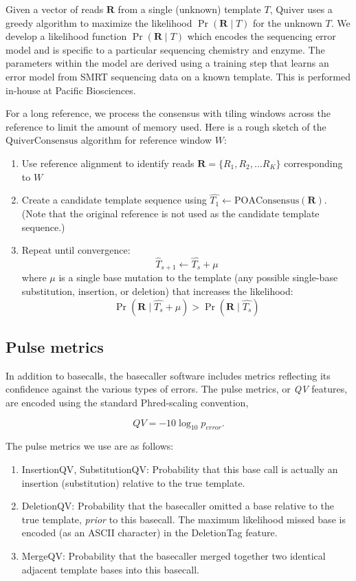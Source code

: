 \documentclass[11pt]{article}
\begin{document}
Given a vector of reads $\mathbf{R}$ from a single (unknown) template $T$, Quiver uses a greedy algorithm to maximize the likelihood $\Pr(\mathbf{R} \mid T)$ for the unknown $T$. We develop a likelihood function $\Pr(\mathbf{R} \mid T)$ which encodes the sequencing error model and is specific to a particular sequencing chemistry and enzyme.  The parameters within the model are derived using a training step that learns an error model from SMRT sequencing data on a known template. This is performed in-house at Pacific Biosciences.

For a long reference, we process the consensus with tiling windows across the reference to limit the amount of memory used. Here is a rough sketch of the $\mathrm{QuiverConsensus}$ algorithm for reference window $W$:\begin{enumerate}
   \item Use reference alignment to identify reads $\mathbf{R}=\{R_1, R_2, \ldots R_K\}$ corresponding to $W$
   \item Create a candidate template sequence using $\hat{T_1} \leftarrow \mathrm{POAConsensus}(\mathbf{R})$. (Note that the original reference is not used as the candidate template sequence.)
   \item Repeat until convergence: $$\hat{T}_{s+1} \leftarrow \hat{T_{s}} + \mu$$ where $\mu$ is a single base mutation to the template (any possible single-base substitution, insertion, or deletion) that increases the likelihood:
     $$\Pr(\mathbf{R} \mid \hat{T_s} + \mu) > \Pr(\mathbf{R} \mid \hat{T_s})$$

\end{enumerate}

\subsection{Pulse metrics}

In addition to basecalls, the basecaller software includes metrics
reflecting its confidence against the various types of errors.  The
pulse metrics, or \emph{QV} features, are encoded using the standard
Phred-scaling convention,

$$QV = -10 \log_{10} p_{error}.$$

The pulse metrics we use are as follows:
\begin{enumerate}
   \item \textsf{InsertionQV}, \textsf{SubstitutionQV}: Probability
     that this base call is actually an insertion (substitution)
     relative to the true template.
   \item \textsf{DeletionQV}: Probability that the basecaller omitted
     a base relative to the true template, \emph{prior} to this
     basecall.  The maximum likelihood missed base is encoded (as an
     ASCII character) in the \textsf{DeletionTag} feature.
   \item \textsf{MergeQV}: Probability that the basecaller merged
     together two identical adjacent template bases into this
     basecall.
\end{enumerate}
\end{document}
